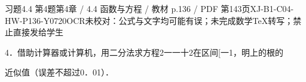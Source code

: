 \begin{bankitem}{习题4.4 第4题}{第4章 / 4.4 函数与方程 / 教材 p.136 / PDF 第143页}{XJ-B1-C04-HW-P136-Y0720}{OCR未校对：公式与文字均可能有误；未完成数学TeX转写；禁止直接发给学生}
\begin{ocrdraft}
\par
4．借助计算器或计算机，用二分法求方程2一一十2在区间[一1，明上的根的
\par
近似值（误差不超过0．01）．
\end{ocrdraft}
\end{bankitem}
